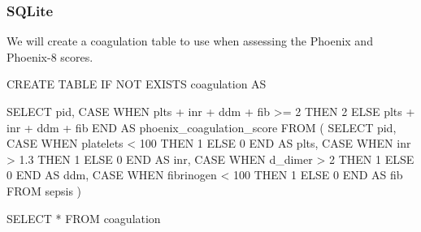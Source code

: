 \documentclass[
  letterpaper,
  DIV=11,
  numbers=noendperiod]{scrartcl}
\newenvironment{Shaded}{\begin{snugshade}}{\end{snugshade}}
\newcommand{\ControlFlowTok}[1]{\textcolor[rgb]{0.00,0.23,0.31}{#1}}
\newcommand{\DecValTok}[1]{\textcolor[rgb]{0.68,0.00,0.00}{#1}}
\newcommand{\FloatTok}[1]{\textcolor[rgb]{0.68,0.00,0.00}{#1}}
\newcommand{\KeywordTok}[1]{\textcolor[rgb]{0.00,0.23,0.31}{#1}}
\newcommand{\NormalTok}[1]{\textcolor[rgb]{0.00,0.23,0.31}{#1}}
\newcommand{\OperatorTok}[1]{\textcolor[rgb]{0.37,0.37,0.37}{#1}}
\begin{document}
\subsubsection{SQLite}\label{sqlite-2}

We will create a coagulation table to use when assessing the Phoenix and
Phoenix-8 scores.

\begin{Shaded}
\begin{Highlighting}[]
\KeywordTok{CREATE} \KeywordTok{TABLE} \ControlFlowTok{IF} \KeywordTok{NOT} \KeywordTok{EXISTS}\NormalTok{ coagulation }\KeywordTok{AS}

\KeywordTok{SELECT}
\NormalTok{  pid,}
  \ControlFlowTok{CASE} \ControlFlowTok{WHEN}\NormalTok{ plts }\OperatorTok{+}\NormalTok{ inr }\OperatorTok{+}\NormalTok{ ddm }\OperatorTok{+}\NormalTok{ fib }\OperatorTok{\textgreater{}=} \DecValTok{2} \ControlFlowTok{THEN} \DecValTok{2}
       \ControlFlowTok{ELSE}\NormalTok{ plts }\OperatorTok{+}\NormalTok{ inr }\OperatorTok{+}\NormalTok{ ddm }\OperatorTok{+}\NormalTok{ fib }\ControlFlowTok{END} \KeywordTok{AS}\NormalTok{ phoenix\_coagulation\_score}
\KeywordTok{FROM}\NormalTok{ (}
  \KeywordTok{SELECT}
\NormalTok{    pid,}
    \ControlFlowTok{CASE} \ControlFlowTok{WHEN}\NormalTok{ platelets }\OperatorTok{\textless{}} \DecValTok{100}  \ControlFlowTok{THEN} \DecValTok{1} \ControlFlowTok{ELSE} \DecValTok{0} \ControlFlowTok{END} \KeywordTok{AS}\NormalTok{ plts,}
    \ControlFlowTok{CASE} \ControlFlowTok{WHEN}\NormalTok{ inr }\OperatorTok{\textgreater{}} \FloatTok{1.3}        \ControlFlowTok{THEN} \DecValTok{1} \ControlFlowTok{ELSE} \DecValTok{0} \ControlFlowTok{END} \KeywordTok{AS}\NormalTok{ inr,}
    \ControlFlowTok{CASE} \ControlFlowTok{WHEN}\NormalTok{ d\_dimer }\OperatorTok{\textgreater{}} \DecValTok{2}      \ControlFlowTok{THEN} \DecValTok{1} \ControlFlowTok{ELSE} \DecValTok{0} \ControlFlowTok{END} \KeywordTok{AS}\NormalTok{ ddm,}
    \ControlFlowTok{CASE} \ControlFlowTok{WHEN}\NormalTok{ fibrinogen }\OperatorTok{\textless{}} \DecValTok{100} \ControlFlowTok{THEN} \DecValTok{1} \ControlFlowTok{ELSE} \DecValTok{0} \ControlFlowTok{END} \KeywordTok{AS}\NormalTok{ fib}
  \KeywordTok{FROM}\NormalTok{ sepsis}
\NormalTok{)}
\end{Highlighting}
\end{Shaded}

\begin{Shaded}
\begin{Highlighting}[]
\KeywordTok{SELECT} \OperatorTok{*} \KeywordTok{FROM}\NormalTok{ coagulation}
\end{Highlighting}
\end{Shaded}
\end{document}
